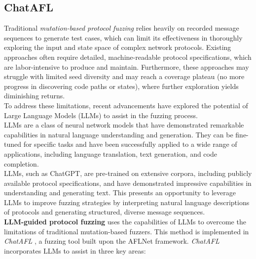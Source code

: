\subsection{ChatAFL}
Traditional \textit{mutation-based protocol fuzzing} relies heavily on recorded message sequences to generate test cases, which can limit its effectiveness in thoroughly exploring the input and state space of complex network protocols. Existing approaches often require detailed, machine-readable protocol specifications, which are labor-intensive to produce and maintain. Furthermore, these approaches may struggle with limited seed diversity and may reach a coverage plateau (no more progress in discovering code paths or states), where further exploration yields diminishing returns.
\\To address these limitations, recent advancements have explored the potential of Large Language Models (LLMs) to assist in the fuzzing process.
\\LLMs are a class of neural network models that have demonstrated remarkable capabilities in natural language understanding and generation. They can be fine-tuned for specific tasks and have been successfully applied to a wide range of applications, including language translation, text generation, and code completion.
\\LLMs, such as ChatGPT, are pre-trained on extensive corpora, including publicly available protocol specifications, and have demonstrated impressive capabilities in understanding and generating text. This presents an opportunity to leverage LLMs to improve fuzzing strategies by interpreting natural language descriptions of protocols and generating structured, diverse message sequences.
\\\textbf{LLM-guided protocol fuzzing} uses the capabilities of LLMs to overcome the limitations of traditional mutation-based fuzzers. This method is implemented in \textit{ChatAFL} \cite{chatafl} , a fuzzing tool built upon the AFLNet framework. \textit{ChatAFL} incorporates LLMs to assist in three key areas:

